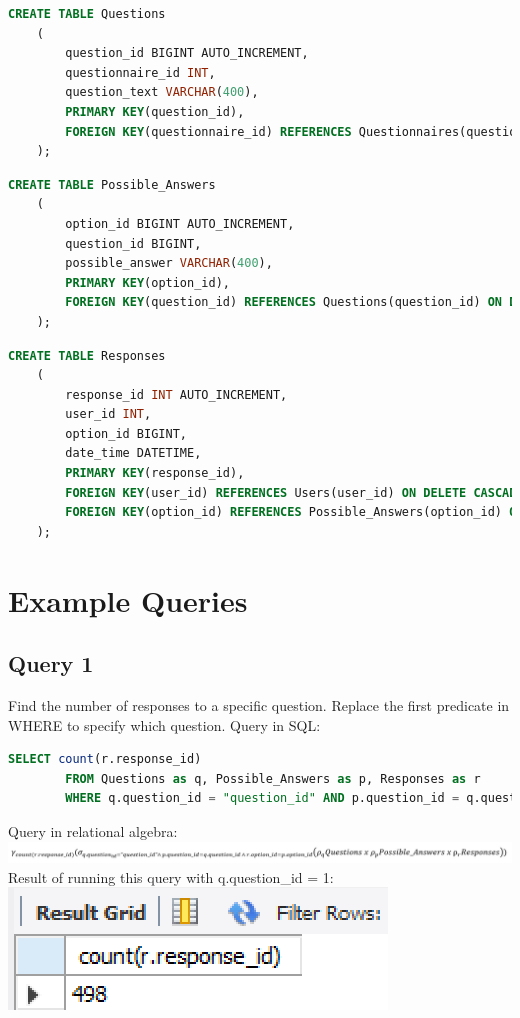 \documentclass[12pt, oneside]{article}
\begin{document}
    \begin{lstlisting}[language=SQL, columns=flexible, breaklines]
    CREATE TABLE Questions
    (
        question_id BIGINT AUTO_INCREMENT,
        questionnaire_id INT,
        question_text VARCHAR(400),
        PRIMARY KEY(question_id),
        FOREIGN KEY(questionnaire_id) REFERENCES Questionnaires(questionnaire_id) ON DELETE CASCADE
    );
    \end{lstlisting}
    \begin{lstlisting}[language=SQL, columns=flexible, breaklines]
    CREATE TABLE Possible_Answers
    (
        option_id BIGINT AUTO_INCREMENT,
        question_id BIGINT,
        possible_answer VARCHAR(400),
        PRIMARY KEY(option_id),
        FOREIGN KEY(question_id) REFERENCES Questions(question_id) ON DELETE CASCADE
    );
    \end{lstlisting}
    \begin{lstlisting}[language=SQL, columns=flexible, breaklines]
    CREATE TABLE Responses
    (
        response_id INT AUTO_INCREMENT,
        user_id INT,
        option_id BIGINT,
        date_time DATETIME,
        PRIMARY KEY(response_id),
        FOREIGN KEY(user_id) REFERENCES Users(user_id) ON DELETE CASCADE,
        FOREIGN KEY(option_id) REFERENCES Possible_Answers(option_id) ON DELETE CASCADE
    );
    \end{lstlisting}
    \section{Example Queries}
    \subsection*{Query 1}
    \noindent Find the number of responses to a specific question. Replace the first predicate in WHERE to specify which question. Query in SQL:
    \begin{lstlisting}[language=SQL, columns=flexible, breaklines]
        SELECT count(r.response_id)
        FROM Questions as q, Possible_Answers as p, Responses as r
        WHERE q.question_id = "question_id" AND p.question_id = q.question_id AND r.option_id = p.option_id
    \end{lstlisting}
    \noindent Query in relational algebra:\\
    \includegraphics{responsecountqueryalgebra.PNG}
    \noindent Result of running this query with q.question\_id = 1:
    \includegraphics{responsecountquery.PNG}
\end{document}
